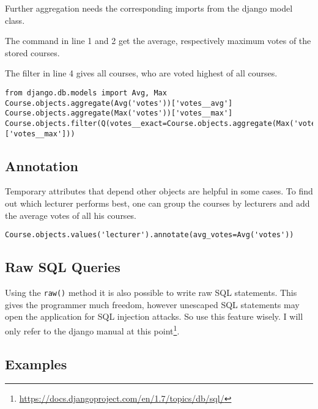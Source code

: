Further aggregation needs the corresponding imports from the django model class.

The command in line 1 and 2 get the average, respectively maximum votes of the stored courses.

The filter in line 4 gives all courses, who are voted highest of all courses.
\begin{lstlisting}[style=Python, caption=Average and Maximum values of objects, label=lst:objects_aggregations]
from django.db.models import Avg, Max
Course.objects.aggregate(Avg('votes'))['votes__avg']
Course.objects.aggregate(Max('votes'))['votes__max']
Course.objects.filter(Q(votes__exact=Course.objects.aggregate(Max('votes'))['votes__max']))
\end{lstlisting}

\subsection{Annotation}

Temporary attributes that depend other objects are helpful in some cases. To find out which lecturer performs best, one can group the courses by lecturers and add the average votes of all his courses.
\begin{lstlisting}[style=Python, caption=Annotating objects, label=lst:objects_annotations]
Course.objects.values('lecturer').annotate(avg_votes=Avg('votes'))
\end{lstlisting}

\subsection{Raw SQL Queries}
Using the \lstinline|raw()| method it is also possible to write raw SQL statements. This gives the programmer much freedom, however unescaped SQL statements may open the application for SQL injection attacks. So use this feature wisely. I will only refer to the django manual at this point\footnote{\url{https://docs.djangoproject.com/en/1.7/topics/db/sql/}}.


\subsection{Examples}

